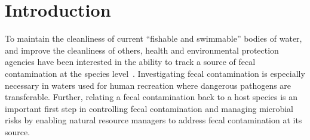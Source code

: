 \documentclass[12pt]{ucthesis}
\begin{document}
\pagestyle{plain}

\renewcommand{\baselinestretch}{1.66}




\chapter{Introduction}\label{chap:intro}
   To maintain the cleanliness of current ``fishable and swimmable'' bodies of
   water, and improve the cleanliness of others, health and environmental
   protection agencies have been interested in the ability to track a source of
   fecal contamination at the species level~\cite{Scott:CurrentMST,
   Simpson:StateOf, Desmarais:SoilInfluence}. Investigating fecal contamination
   is especially necessary in waters used for human recreation where dangerous
   pathogens are transferable. Further, relating a fecal contamination back to
   a host species is an important first step in controlling fecal contamination
   and managing microbial risks by enabling natural resource managers to
   address fecal contamination at its source.
\end{document}
